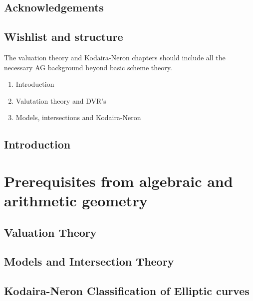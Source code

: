 


\rmfamily
\setcounter{page}{0}
\newpage
\tableofcontents
\listoftodos
\chapter*{Acknowledgements} \label{chap:acknowledgements}

\setcounter{chapter}{-1}
\chapter{Wishlist and structure} \label{chap:wishlist}
The valuation theory and Kodaira-Neron chapters should include all the necessary AG background beyond basic scheme theory. 
\begin{enumerate}
	\item Introduction
	\item Valutation theory and DVR's
	\item Models, intersections and Kodaira-Neron
\end{enumerate}


\setcounter{page}{0}

\chapter{Introduction} \label{chap:introduction}


\part{Prerequisites from algebraic and arithmetic geometry}
\chapter{Valuation Theory} \label{chap:valuation_theory}



\chapter{Models and Intersection Theory} \label{chap:models_and_intersection_theory}

\chapter{Kodaira-Neron Classification of Elliptic curves} \label{chap:kodaira-neron_classification_of_elliptic_curves}

